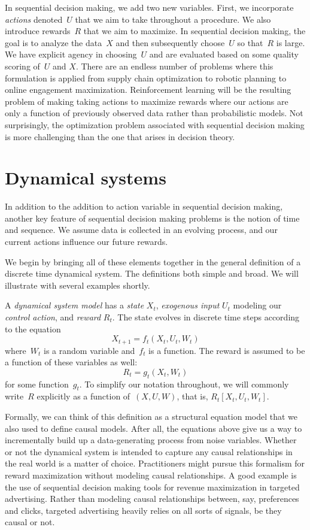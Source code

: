 \documentclass{tufte-book}
\begin{document}
In sequential decision making, we add two new variables. First, we
incorporate \emph{actions} denoted~\(U\) that we aim to take throughout
a procedure. We also introduce rewards~\(R\) that we aim to maximize. In
sequential decision making, the goal is to analyze the data~\(X\) and
then subsequently choose~\(U\) so that~\(R\) is large. We have explicit
agency in choosing~\(U\) and are evaluated based on some quality scoring
of~\(U\) and \(X\). There are an endless number of problems where this
formulation is applied from supply chain optimization to robotic
planning to online engagement maximization. Reinforcement learning will
be the resulting problem of making taking actions to maximize rewards
where our actions are only a function of previously observed data rather
than probabilistic models. Not surprisingly, the optimization problem
associated with sequential decision making is more challenging than the
one that arises in decision theory.

\hypertarget{dynamical-systems}{%
\section{Dynamical systems}\label{dynamical-systems}}


In addition to the addition to action variable in sequential decision
making, another key feature of sequential decision making problems is
the notion of time and sequence. We assume data is collected in an
evolving process, and our current actions influence our future rewards.

We begin by bringing all of these elements together in the general
definition of a discrete time dynamical system. The definitions both
simple and broad. We will illustrate with several examples shortly.

A \emph{dynamical system model} has a \emph{state} \(X_t\),
\emph{exogenous input} \(U_t\) modeling our \emph{control action}, and
\emph{reward} \(R_t\). The state evolves in discrete time steps
according to the equation \[
    X_{t+1} = f_t(X_t,U_t,W_t)
\] where~\(W_t\) is a random variable and~\(f_t\) is a function. The
reward is assumed to be a function of these variables as well: \[
    R_{t} = g_t(X_t,W_t)
\] for some function~\(g_t\). To simplify our notation throughout, we
will commonly write~\(R\) explicitly as a function of~\((X,U,W)\), that
is, \(R_t[X_t,U_t,W_t]\).

Formally, we can think of this definition as a structural equation model
that we also used to define causal models. After all, the equations
above give us a way to incrementally build up a data-generating process
from noise variables. Whether or not the dynamical system is intended to
capture any causal relationships in the real world is a matter of
choice. Practitioners might pursue this formalism for reward
maximization without modeling causal relationships. A good example is
the use of sequential decision making tools for revenue maximization in
targeted advertising. Rather than modeling causal relationships between,
say, preferences and clicks, targeted advertising heavily relies on all
sorts of signals, be they causal or not.
\end{document}
